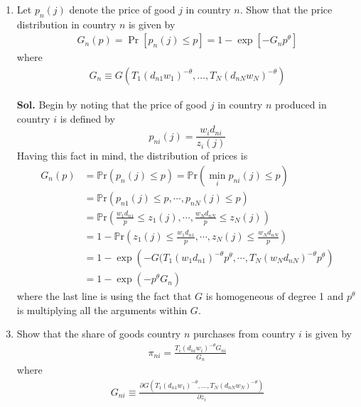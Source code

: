 \documentclass[12pt,oneside,reqno]{amsart}
\newcommand{\pr}{\mathbb{P}\mathrm{r}}
\begin{document}
\begin{enumerate}
    \item Let $p_n(j)$ denote the price of good $j$ in country $n$. Show that the price distribution in country $n$ is given by
    \begin{align*}
        G_n(p)=\operatorname{Pr}\left[p_n(j) \leq p\right]=1-\exp \left[-G_n p^\theta\right]
    \end{align*}
    where
    \begin{align*}
        G_n \equiv G\left(T_1\left(d_{n 1} w_1\right)^{-\theta}, \ldots, T_N\left(d_{n N} w_N\right)^{-\theta}\right)
    \end{align*}
    \item[\textbf{Sol.}] Begin by noting that the price of good $j$ in country $n$ produced in country $i$ is defined by 
    \begin{equation*}
        p_{ni}(j) = \frac{w_id_{ni}}{z_i(j)}
    \end{equation*}
    Having this fact in mind, the distribution of prices is
    \begin{align*}
        G_n(p) &= \pr\left(p_n(j)\leq p \right) = \pr\left(\min_{i}p_{ni}(j)\leq p \right) \\ 
        &= \pr\left(p_{n1}(j)\leq p,\cdots,p_{nN}(j)\leq p \right) \\ 
        &= \pr\left(\frac{w_1d_{n1}}{p}\leq z_1(j),\cdots,\frac{w_Nd_{nN}}{p}\leq z_N(j) \right) \\ 
        &= 1-\pr\left(z_1(j)\leq \frac{w_1d_{n1}}{p},\cdots,z_N(j)\leq \frac{w_Nd_{nN}}{p}\right) \\ 
        &= 1-\exp\left(-G(T_1\left(w_1d_{n1}\right)^{-\theta}p^{\theta},\cdots,T_N\left(w_Nd_{nN}\right)^{-\theta}p^{\theta} \right) \\ 
        &= 1-\exp\left(-p^{\theta}G_n\right) 
    \end{align*}
    where the last line is using the fact that $G$ is homogeneous of degree 1 and $p^{\theta}$ is multiplying all the arguments within $G$. 
    \item Show that the share of goods country $n$ purchases from country $i$ is given by
    \begin{align*}
        \pi_{n i}=\frac{T_i\left(d_{n i} w_i\right)^{-\theta} G_{n i}}{G_n}
    \end{align*}
    where
    \begin{align*}
        G_{n i} \equiv \frac{\partial G\left(T_1\left(d_{n 1} w_1\right)^{-\theta}, \ldots, T_N\left(d_{n N} w_N\right)^{-\theta}\right)}{\partial z_i}

\end{align*}
\end{enumerate}
\end{document}
